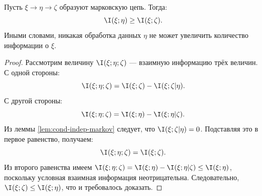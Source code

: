 \begin{theorem}
	\label{thm:data-processing}
	Пусть $\xi \to \eta \to \zeta$ образуют марковскую цепь. Тогда:
	\[
		\I(\xi; \eta) \geq \I(\xi; \zeta).
	\]
	Иными словами, никакая обработка данных $\eta$ не может увеличить количество информации о $\xi$.
\end{theorem}
\begin{proof}
	Рассмотрим величину $\I(\xi; \eta; \zeta)$ — взаимную информацию трёх величин. С одной стороны:
	\[
		\I(\xi; \eta; \zeta) = \I(\xi; \zeta) - \I(\xi; \zeta | \eta).
	\]
	С другой стороны:
	\[
		\I(\xi; \eta; \zeta) = \I(\xi; \eta) - \I(\xi; \eta | \zeta).
	\]
	Из леммы \ref{lem:cond-indep-markov} следует, что $\I(\xi; \zeta | \eta) = 0$. Подставляя это в первое равенство, получаем:
	\[
		\I(\xi; \eta; \zeta) = \I(\xi; \zeta).
	\]
	Из второго равенства имеем $\I(\xi; \eta; \zeta) = \I(\xi; \eta) - \I(\xi; \eta | \zeta) \leq \I(\xi; \eta)$, поскольку условная взаимная информация неотрицательна. Следовательно, $\I(\xi; \zeta) \leq \I(\xi; \eta)$, что и требовалось доказать.
\end{proof}

